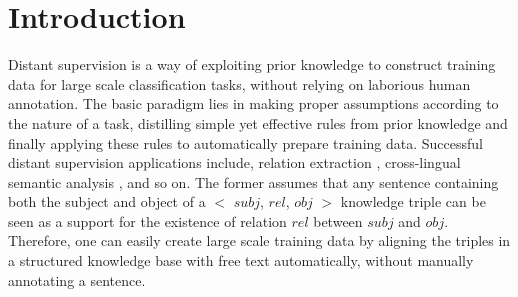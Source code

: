 \section{Introduction}




Distant supervision is a way of exploiting prior knowledge  to construct training data for large scale classification tasks, without relying on laborious human annotation. 
The basic paradigm lies in making proper assumptions according to the nature of a task, distilling simple yet effective rules from prior knowledge and finally applying these rules to automatically prepare training data. Successful distant supervision applications include, relation extraction \cite{mintz2009distant}, cross-lingual semantic analysis \cite{fang2016learning}, and so on. The former assumes that any sentence containing both the subject and object of a $<$ $subj$,  $rel$,  $obj$ $>$ knowledge triple can be seen as a support for the existence of relation $rel$ between $subj$ and $obj$. Therefore, one can easily create large scale training data by aligning the triples in a structured knowledge base with free text automatically, without manually annotating a sentence. 


